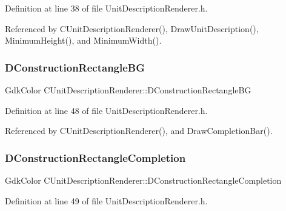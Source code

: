 Definition at line 38 of file Unit\+Description\+Renderer.\+h.



Referenced by C\+Unit\+Description\+Renderer(), Draw\+Unit\+Description(), Minimum\+Height(), and Minimum\+Width().

\hypertarget{classCUnitDescriptionRenderer_a7a763ac1aec2ee9d3b70694e1fbe4f9d}{}\label{classCUnitDescriptionRenderer_a7a763ac1aec2ee9d3b70694e1fbe4f9d} 
\subsubsection{\texorpdfstring{D\+Construction\+Rectangle\+BG}{DConstructionRectangleBG}}
{\footnotesize\ttfamily Gdk\+Color C\+Unit\+Description\+Renderer\+::\+D\+Construction\+Rectangle\+BG\hspace{0.3cm}{\ttfamily [protected]}}



Definition at line 48 of file Unit\+Description\+Renderer.\+h.



Referenced by C\+Unit\+Description\+Renderer(), and Draw\+Completion\+Bar().

\hypertarget{classCUnitDescriptionRenderer_a6a512a78402b31fefb80794af96c1912}{}\label{classCUnitDescriptionRenderer_a6a512a78402b31fefb80794af96c1912} 
\subsubsection{\texorpdfstring{D\+Construction\+Rectangle\+Completion}{DConstructionRectangleCompletion}}
{\footnotesize\ttfamily Gdk\+Color C\+Unit\+Description\+Renderer\+::\+D\+Construction\+Rectangle\+Completion\hspace{0.3cm}{\ttfamily [protected]}}



Definition at line 49 of file Unit\+Description\+Renderer.\+h.



